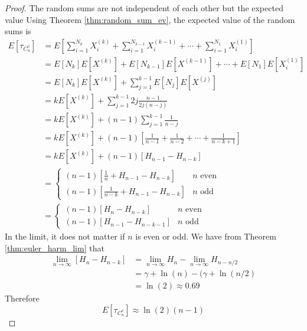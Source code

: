 \begin{proof}
The random sums are not independent of each other but the expected value  
Using Theorem \ref{thm:random_sum_ev}, the expected value of the random sums is
\begin{align*}
    E[\tau_{C_n^{v}}] &= E\left[\sum_{i = 1}^{N_k} X_i^{(k)} + \sum_{i = 1}^{N_{k - 1}} X_i^{(k - 1)} + \cdots + \sum_{i = 1}^{N_1} X_i^{(1)}\right]\\
    &= E[N_k] E[X^{(k)}] + E[N_{k - 1}] E[X^{(k - 1)}] + \cdots + E[N_1]E[X_i^{(1)}]\\
    &= E[N_k] E[X^{(k)}] + \sum_{j = 1}^{k - 1} E[N_j]E[X^{(j)}]\\
    &= k E[X^{(k)}] + \sum_{j = 1}^{k - 1} 2j \frac{n - 1}{2j (n - j)} \\
    &= k E[X^{(k)}] + (n - 1) \sum_{j = 1}^{k - 1} \frac{1}{n - j}\\
    &= k E[X^{(k)}] + (n - 1) \left[ \frac{1}{n - 1} + \frac{1}{n - 2} + \cdots + \frac{1}{n - k + 1} \right]\\
    &= k E[X^{(k)}] + (n - 1) \left[ H_{n - 1} - H_{n - k} \right]\\
    &= \begin{cases}
    (n - 1) \left[\frac{1}{n} + H_{n - 1} - H_{n - k}\right] & n \text{ even}\\
    (n - 1) \left[\frac{1}{n - k} + H_{n - 1} - H_{n - k}\right] & n \text{ odd}
    \end{cases}\\
    &= \begin{cases}
    (n - 1) \left[H_{n} - H_{n - k}\right] & n \text{ even}\\
    (n - 1) \left[H_{n - 1} - H_{n - k - 1}\right] & n \text{ odd}
\end{cases}
\end{align*}
In the limit, it does not matter if $n$ is even or odd.
We have from Theorem \ref{thm:euler_harm_lim} that
\begin{align*}
    \lim_{n \to \infty} [H_{n} - H_{n - k}] &=  \lim_{n \to \infty} H_{n} - \lim_{n \to \infty}  H_{n - n/2}\\
    &= \gamma + \ln(n) - (\gamma + \ln(n/2)\\
    &= \ln(2) \approx 0.69
\end{align*}
Therefore
$$
E[\tau_{C_n^{v}}] \approx \ln(2) (n - 1)
$$
\end{proof}


